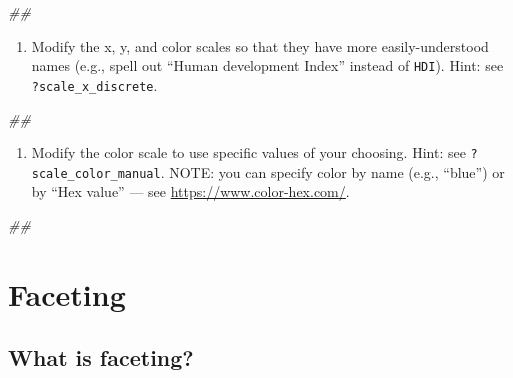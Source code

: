 \documentclass[]{book}
\newenvironment{Shaded}{\begin{snugshade}}{\end{snugshade}}
\newcommand{\CommentTok}[1]{\textcolor[rgb]{0.56,0.35,0.01}{\textit{#1}}}
\providecommand{\tightlist}{%
  \setlength{\itemsep}{0pt}\setlength{\parskip}{0pt}}
\begin{document}
\begin{Shaded}
\begin{Highlighting}[]
\CommentTok{## }
\end{Highlighting}
\end{Shaded}

\begin{enumerate}
\def\labelenumi{\arabic{enumi}.}
\setcounter{enumi}{1}
\tightlist
\item
  Modify the x, y, and color scales so that they have more easily-understood names (e.g., spell out ``Human development Index'' instead of \texttt{HDI}). Hint: see \texttt{?scale\_x\_discrete}.
\end{enumerate}

\begin{Shaded}
\begin{Highlighting}[]
\CommentTok{## }
\end{Highlighting}
\end{Shaded}

\begin{enumerate}
\def\labelenumi{\arabic{enumi}.}
\setcounter{enumi}{2}
\tightlist
\item
  Modify the color scale to use specific values of your choosing. Hint: see \texttt{?scale\_color\_manual}. NOTE: you can specify color by name (e.g., ``blue'') or by ``Hex value'' --- see \url{https://www.color-hex.com/}.
\end{enumerate}

\begin{Shaded}
\begin{Highlighting}[]
\CommentTok{## }
\end{Highlighting}
\end{Shaded}

\hypertarget{faceting}{%
\section{Faceting}\label{faceting}}

\hypertarget{what-is-faceting}{%
\subsection{What is faceting?}\label{what-is-faceting}}
\end{document}
